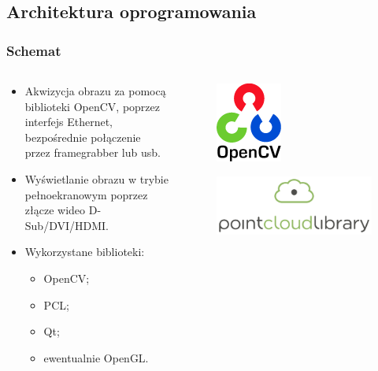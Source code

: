 \documentclass{beamer}
\begin{document}
\subsection{Architektura oprogramowania}
\begin{frame}\frametitle{Schemat}
  
    \begin{columns}
    
      \begin{column}{6cm}

	\begin{itemize}
	\item Akwizycja obrazu za pomocą biblioteki OpenCV, poprzez interfejs Ethernet, bezpośrednie połączenie przez framegrabber lub usb.\pause
	\item Wyświetlanie obrazu w trybie pełnoekranowym poprzez złącze wideo D-Sub/DVI/HDMI.\pause
	\item Wykorzystane biblioteki: 
	  \begin{itemize}
	    \item OpenCV;
	    \item PCL;
	    \item Qt;
	    \item ewentualnie OpenGL.
	  \end{itemize}
	\end{itemize}
	
      
      \end{column}
    
    \begin{column}{6cm}
     
      \begin{figure}[htb]
	\begin{center}
	  \includegraphics[angle=0,scale=0.3]{opencv.png}
	\end{center}
      \end{figure}
      
      \begin{figure}[htb]
	\begin{center}
	  \includegraphics[angle=0,scale=0.05]{pcl.png}
	\end{center}
      \end{figure}
      

\end{column}
\end{columns}
\end{frame}
\end{document}
